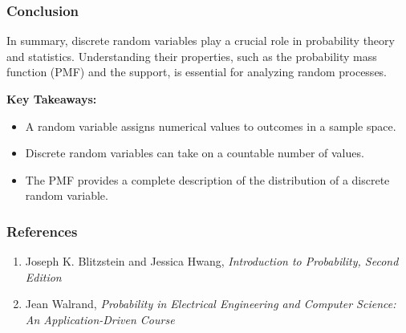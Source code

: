\documentclass{beamer}
\begin{document}
\begin{frame}
    \frametitle{Conclusion}
    In summary, discrete random variables play a crucial role in probability theory and statistics. Understanding their properties, such as the probability mass function (PMF) and the support, is essential for analyzing random processes. 

    \textbf{Key Takeaways:}
    \begin{itemize}
        \item A random variable assigns numerical values to outcomes in a sample space.
        \item Discrete random variables can take on a countable number of values.
        \item The PMF provides a complete description of the distribution of a discrete random variable.
    \end{itemize}
\end{frame}

\begin{frame}
    \frametitle{References}
    \begin{enumerate}
        \item Joseph K. Blitzstein and Jessica Hwang, \textit{Introduction to Probability, Second Edition}
        \item Jean Walrand, \textit{Probability in Electrical Engineering and Computer Science: An Application-Driven Course}
    \end{enumerate}
\end{frame}
\end{document}
